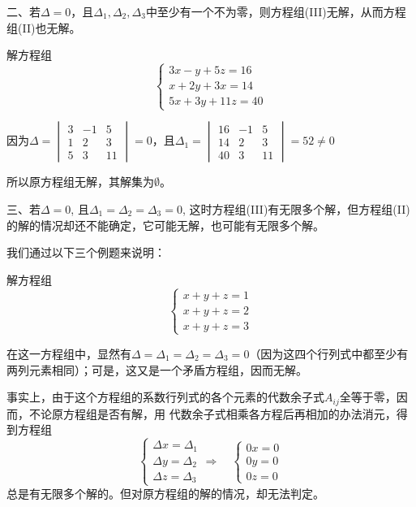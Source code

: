 二、若$\Delta=0$，且$\Delta_1,\Delta_2,\Delta_3$中至少有一个不为零，则方程组(III)无解，从而方程组(II)也无解。

\begin{example}
    解方程组
    \[\begin{cases}
        3x-y+5z=16\\
        x+2y+3x=14\\
        5x+3y+11z=40
    \end{cases}\]
\end{example}

\begin{solution}
因为$\Delta=\begin{vmatrix}
    3&-1&5\\1&2&3\\5&3&11
\end{vmatrix}=0$，且$\Delta_1=\begin{vmatrix}
    16&-1&5\\14&2&3\\40&3&11
\end{vmatrix}=52\ne 0$
    
所以原方程组无解，其解集为$\emptyset$。
\end{solution}

三、若$\Delta=0$, 且$\Delta_1=\Delta_2=\Delta_3=0$, 这时方程组(III)有无限多个解，但方程组(II)的解的情况却还不能确定，它可能无解，也可能有无限多个解。

我们通过以下三个例题来说明：
\begin{example}
    解方程组
\[\begin{cases}
    x+y+z=1\\x+y+z=2\\x+y+z=3
\end{cases}\]
\end{example}

\begin{solution}
在这一方程组中，显然有$\Delta=\Delta_1=\Delta_2=\Delta_3=0$（因为这四个行列式中都至少有两列元素相同）；可是，这又是一个矛盾方程组，因而无解。

事实上，由于这个方程组的系数行列式的各个元素的代数余子式$A_{ij}$全等于零，因而，不论原方程组是否有解，用
代数余子式相乘各方程后再相加的办法消元，得到方程组
\[\begin{cases}
    \Delta x=\Delta_1\\
    \Delta y=\Delta_2\\
    \Delta z=\Delta_3
\end{cases}\Rightarrow\quad \begin{cases}
    0x=0\\0y=0\\0z=0
\end{cases}\]
总是有无限多个解的。但对原方程组的解的情况，却无法判定。
\end{solution}


